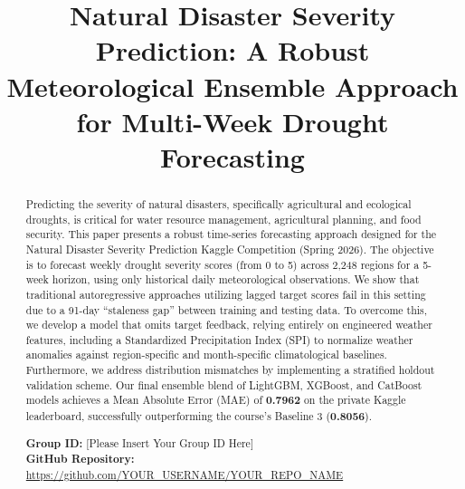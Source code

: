 \documentclass[conference]{IEEEtran}
\begin{document}
\title{Natural Disaster Severity Prediction: A Robust Meteorological Ensemble Approach for Multi-Week Drought Forecasting}

\author{
\and
{}
}

\maketitle

\begin{abstract}
Predicting the severity of natural disasters, specifically agricultural and ecological droughts, is critical for water resource management, agricultural planning, and food security. This paper presents a robust time-series forecasting approach designed for the Natural Disaster Severity Prediction Kaggle Competition (Spring 2026). The objective is to forecast weekly drought severity scores (from 0 to 5) across 2,248 regions for a 5-week horizon, using only historical daily meteorological observations. We show that traditional autoregressive approaches utilizing lagged target scores fail in this setting due to a 91-day ``staleness gap'' between training and testing data. To overcome this, we develop a model that omits target feedback, relying entirely on engineered weather features, including a Standardized Precipitation Index (SPI) to normalize weather anomalies against region-specific and month-specific climatological baselines. Furthermore, we address distribution mismatches by implementing a stratified holdout validation scheme. Our final ensemble blend of LightGBM, XGBoost, and CatBoost models achieves a Mean Absolute Error (MAE) of \textbf{0.7962} on the private Kaggle leaderboard, successfully outperforming the course's Baseline 3 (\textbf{0.8056}).

\noindent \textbf{Group ID:} [Please Insert Your Group ID Here] \\
\noindent \textbf{GitHub Repository:} \href{https://github.com/YOUR_USERNAME/YOUR_REPO_NAME}{https://github.com/YOUR_USERNAME/YOUR_REPO_NAME}
\end{abstract}
\end{document}
